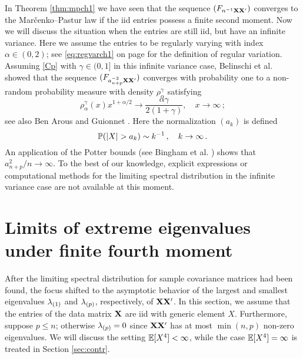 In Theorem \ref{thm:mpch1} we have seen that the sequence $(F_{n^{-1}{\mathbf X} {\mathbf X}'})$ converges to the Mar\v cenko--Pastur law if the iid entries possess a finite second moment. Now we will discuss the situation when the entries are still iid, but have an infinite variance. Here we assume the entries to be regularly varying with index $\alpha \in (0,2)$; see \eqref{eq:regvarch1} on page \pageref{eq:regvarch1} for the definition of regular variation.
Assuming \eqref{Cp} with $\gamma\in (0,1]$ in this infinite variance case, Belinschi et al.~\cite[Theorem~1.10]{belinschi:dembo:guionnet:2009} showed that the sequence $(F_{a_{n+p}^{-2}{\mathbf X} {\mathbf X}'})$ converges with probability one to a non-random probability measure with density $\rho_{\alpha}^\gamma$ satisfying
\begin{equation}\label{eq:esd}
\rho_{\alpha}^\gamma(x) x^{1+\alpha/2} \to \frac{\alpha \gamma}{2(1+\gamma)}, \quad x \to \infty\,;
\end{equation}
see also Ben Arous and Guionnet \cite[Theorem~1.6]{arous:guionnet:2008}.
Here the normalization $(a_k)$ is defined \sth\ 
\begin{equation}\label{eq:defanp}
\P(|X|>a_k)\sim k^{-1}\,,\quad k\to\infty\,.
\end{equation}
An application of the Potter bounds (see Bingham et al. \cite[p.~25]{bingham:goldie:teugels:1987}) shows that $a_{n+p}^2/n \to \infty$. To the best of our knowledge, explicit expressions or computational methods for the limiting spectral distribution in the infinite variance case are not available at this moment.



\section{Limits of extreme eigenvalues under finite fourth moment}

After the limiting spectral distribution for sample covariance matrices had been found, the focus shifted to the asymptotic behavior of the largest and smallest eigenvalues $\lambda_{(1)}$ and $\lambda_{(p)}$, respectively, of ${\mathbf X}{\mathbf X}'$. 
In this section, we assume that the entries of the data matrix ${\mathbf X}$ are iid with generic element $X$. Furthermore, suppose $p\le n$; otherwise $\lambda_{(p)}=0$ since ${\mathbf X}{\mathbf X}'$ has at most $\min(n,p)$ non-zero eigenvalues.
We will discuss the setting $\mathbb{E}[X^4]<\infty$, while the case $\mathbb{E}[X^4]=\infty$ is treated in Section \ref{sec:contr}.

